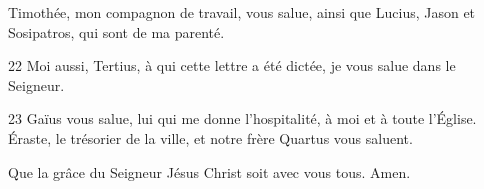 Timothée, mon compagnon de travail, vous salue, ainsi que Lucius, Jason et Sosipatros, qui sont de ma parenté.

22 Moi aussi, Tertius, à qui cette lettre a été dictée, je vous salue dans le Seigneur.

23 Gaïus vous salue, lui qui me donne l’hospitalité, à moi et à toute l’Église. Éraste, le trésorier de la ville, et notre frère Quartus vous saluent.

Que la grâce du Seigneur Jésus Christ soit avec vous tous. Amen.